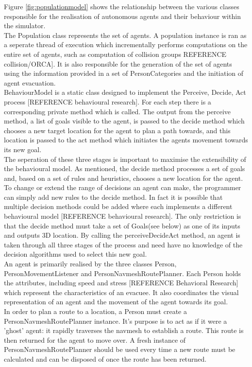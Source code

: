 Figure \ref{fig:populationmodel} shows the relationship between the various classes responsible
for the realisation of autonomous agents and their behaviour within the simulator.
\\
The Population class represents the set of agents. A population instance is ran as a seperate thread of execution which
incrementally performs computations on the entire set of agents, such as computation of collision groups {REFERENCE collision/ORCA]. It is also responsible
for the generation of the set of agents using the information provided in a set of PersonCategories and the initiation
of agent evacuation.
\\
BehaviourModel is a static class designed to implement the Perceive, Decide, Act process [REFERENCE behavioural research]. For each step there is a corresponding 
private method which is called. The output from the perceive method, a list of goals visible to the agent, is passed to the decide method
which chooses a new target location for the agent to plan a path towards, and this location is passed to the act method which initiates the agents
movement towards its new goal.
\\
The seperation of these three stages is important to maximise the extensibility of the behavioural model. As mentioned, the decide method processes a set of
goals and, based on a set of rules and heuristics, chooses a new location for the agent. To change or extend the range of decisions an agent can make,
the programmer can simply add new rules to the decide method. In fact it is possible that multiple decision methods could be added where each implements
a different behavioural model [REFERENCE behavioural research]. The only restriction is that the decide method must take a set of Goals(see below) as one of its inputs and outputs 3D location.
By calling the perceiveDecideAct method, an agent is taken through all three stages of the process and need have no knowledge of the decision algorithms used to select this new goal.
\\

An agent is primarily realised by the three classes Person, PersonMovementListener and PersonNavmeshRoutePlanner. 
Each Person holds the attributes, including speed and stress [REFERENCE Behavioral Research] which represent the characteristics of 
an evacuee. It also coordinates the visual representation of an agent and the movement of the agent towards its goal.
\\
In order to plan a route to a location, a Person must create a PersonNavmeshRoutePlanner instance. It's purpose is to act 
as if it were a 'ghost' agent: it rapidly traverses the navmesh to establish a route. This route is then returned for the 
agent to move over. A fresh instance of PersonNavmeshRoutePlanner should be used every time a new route must be calculated and can be disposed
of once the route has been returned.
}
